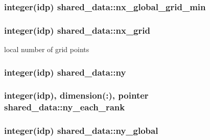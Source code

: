 \subsubsection[{\texorpdfstring{nx\+\_\+global\+\_\+grid\+\_\+min}{nx_global_grid_min}}]{\setlength{\rightskip}{0pt plus 5cm}integer(idp) shared\+\_\+data\+::nx\+\_\+global\+\_\+grid\+\_\+min}\hypertarget{namespaceshared__data_ac7d2abcd22e1c66dd8219334bfd59d32}{}\label{namespaceshared__data_ac7d2abcd22e1c66dd8219334bfd59d32}
\subsubsection[{\texorpdfstring{nx\+\_\+grid}{nx_grid}}]{\setlength{\rightskip}{0pt plus 5cm}integer(idp) shared\+\_\+data\+::nx\+\_\+grid}\hypertarget{namespaceshared__data_aa73479038f32b1c04369ee19f989a864}{}\label{namespaceshared__data_aa73479038f32b1c04369ee19f989a864}


local number of grid points 

\subsubsection[{\texorpdfstring{ny}{ny}}]{\setlength{\rightskip}{0pt plus 5cm}integer(idp) shared\+\_\+data\+::ny}\hypertarget{namespaceshared__data_a93124935df137a6ba362bdc8dcba6d5f}{}\label{namespaceshared__data_a93124935df137a6ba362bdc8dcba6d5f}
\subsubsection[{\texorpdfstring{ny\+\_\+each\+\_\+rank}{ny_each_rank}}]{\setlength{\rightskip}{0pt plus 5cm}integer(idp), dimension(\+:), pointer shared\+\_\+data\+::ny\+\_\+each\+\_\+rank}\hypertarget{namespaceshared__data_a1307d0cb9f9d652ec67954e53bf04706}{}\label{namespaceshared__data_a1307d0cb9f9d652ec67954e53bf04706}
\subsubsection[{\texorpdfstring{ny\+\_\+global}{ny_global}}]{\setlength{\rightskip}{0pt plus 5cm}integer(idp) shared\+\_\+data\+::ny\+\_\+global}\hypertarget{namespaceshared__data_a09d6529711aae354967f6d5db76220c1}{}\label{namespaceshared__data_a09d6529711aae354967f6d5db76220c1}
